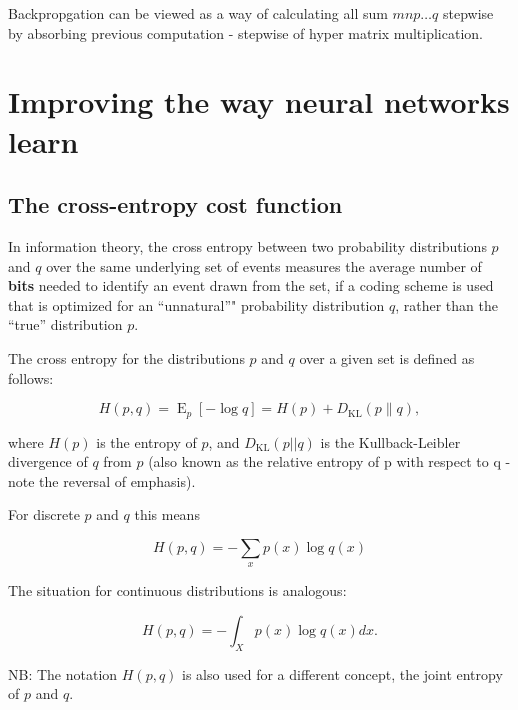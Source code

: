 \documentclass[]{book}
\begin{document}
Backpropgation can be viewed as a way of calculating all sum
\(mnp \ldots q\) stepwise by absorbing previous computation - stepwise
of hyper matrix multiplication.

\chapter{Improving the way neural networks learn}\label{ipln}

\section{The cross-entropy cost
function}\label{the-cross-entropy-cost-function}

In information theory, the cross entropy between two probability
distributions \({\displaystyle p}\) and \({\displaystyle q}\) over the
same underlying set of events measures the average number of
\textbf{bits} needed to identify an event drawn from the set, if a
coding scheme is used that is optimized for an ``unnatural''"
probability distribution \({\displaystyle q}\), rather than the ``true''
distribution \({\displaystyle p}\).

The cross entropy for the distributions \({\displaystyle p}\) and
\({\displaystyle q}\) over a given set is defined as follows:

\begin{equation}
\displaystyle H(p,q) = \operatorname{E}_{p}[-\log q] = H(p) + D_{\mathrm{KL}}(p\|q),
\end{equation}

where \({\displaystyle H(p)}\) is the entropy of \({\displaystyle p}\),
and \({\displaystyle D_{\mathrm {KL}}(p||q)}\) is the Kullback-Leibler
divergence of \({\displaystyle q}\) from \({\displaystyle p}\) (also
known as the relative entropy of p with respect to q - note the reversal
of emphasis).

For discrete \({\displaystyle p}\) and \({\displaystyle q}\) this means

\begin{equation}
\displaystyle H(p,q) = - \sum_{x} p(x) \log q(x)
\end{equation}

The situation for continuous distributions is analogous:

\begin{equation}
\displaystyle H(p,q) = -\int_{X} p(x) \log q(x) dx.
\end{equation}

NB: The notation \({\displaystyle H(p,q)}\) is also used for a different
concept, the joint entropy of \({\displaystyle p}\) and
\({\displaystyle q}\).
\end{document}
